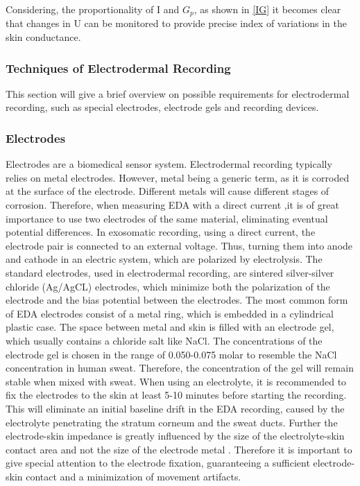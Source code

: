 Considering, the proportionality of I and $G_{p}$, as shown in \ref{IG} it becomes clear that changes in U can be monitored to provide precise index of variations in the skin conductance.\\

\subsubsection{Techniques of Electrodermal Recording}
This section will give a brief overview on possible requirements for electrodermal recording, such as special electrodes, electrode gels and recording devices.

\subsubsection{Electrodes}
Electrodes are a biomedical sensor system. Electrodermal recording typically relies on metal electrodes. However, metal being a generic term, as it is corroded at the surface of the electrode. Different metals will cause different stages of corrosion. Therefore, when measuring EDA with a direct current ,it is of great importance to use two electrodes of the same material, eliminating eventual potential differences. In exosomatic recording, using a direct current, the electrode pair is connected to an external voltage. Thus, turning them into anode and cathode in an electric system, which are polarized by electrolysis.
The standard electrodes, used in electrodermal recording, are sintered silver-silver chloride (Ag/AgCL) electrodes, which minimize both the polarization of the electrode and the bias potential between the electrodes. The most common form of EDA electrodes consist of a metal ring, which is embedded in a cylindrical plastic case. The space between metal and skin is filled with an electrode gel, which usually contains a chloride salt like NaCl. The concentrations of the electrode gel is chosen in the range of 0.050-0.075 molar to resemble the NaCl concentration in human sweat. Therefore, the concentration of the gel will remain stable when mixed with sweat. When using an electrolyte, it is recommended to fix the electrodes to the skin at least 5-10 minutes before starting the recording. This will eliminate an initial  baseline drift in the EDA recording, caused by the electrolyte penetrating the stratum corneum and the sweat ducts. Further the electrode-skin impedance is greatly influenced by the size of the electrolyte-skin contact area and not the size of the electrode metal \citep{boucsein2012electrodermal}. Therefore it is important to give special attention to the electrode fixation, guaranteeing a sufficient electrode-skin contact and a minimization of movement artifacts.

